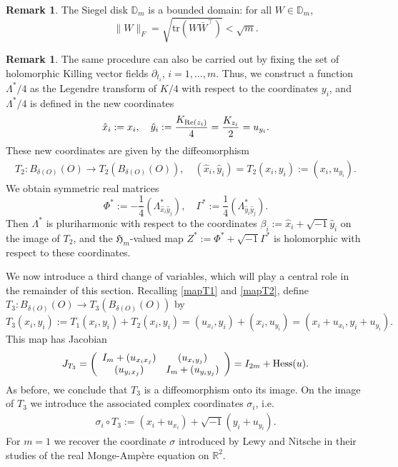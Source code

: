 \documentclass[11pt,reqno]{amsart}
\theoremstyle{plain}
\theoremstyle{definition}
\newtheorem{remark}[theorem]{Remark}
\numberwithin{equation}{section}
\begin{document}
\begin{remark}\label{bounded}  
The Siegel disk $\mathbb{D}_m$ is a bounded domain: for all $W\in \mathbb{D}_{m}$,
$$\|W\|_F = \sqrt{\mathrm{tr}(W\overline{W}^{\top})} < \sqrt{m}.$$
\end{remark}
    
\begin{remark}
The same procedure can also be carried out by fixing the set of holomorphic Killing vector fields $\partial_{t_i}$, $i = 1,\ldots, m$. Thus, we construct a function $\Lambda^{*}/4$ as the Legendre transform of $K/4$ with respect to the coordinates $y_{i}$, and $\Lambda^*/4$ is defined in the new coordinates
$$\hat{x}_{i}:=x_{i},\quad  \hat{y}_{i}:=\frac{K_{{\rm Re}(z_i)}}{4} = \frac{K_{z_{i}}}{2}=u_{y_{i}}.$$
These new coordinates are given by the diffeomorphism
\begin{align}\label{mapT2}T_{2}: B_{\delta(O)}(O)\to T_{2}(B_{\delta(O)}(O)), \quad (\hat{x}_i, \hat{y}_i) = T_2(x_i,y_i) := (x_{i},u_{y_{i}}).\end{align}
We obtain symmetric real matrices
$$\Phi^* := -\frac{1}{4}(\Lambda^{*}_{\hat{x}_{i}\hat{y}_{j}}),\quad  \Gamma^* :=\frac{1}{4}(\Lambda^{*}_{\hat{y}_{i}\hat{y}_{j}}).$$
Then $\Lambda^{*}$ is pluriharmonic with respect to the coordinates $\beta_{i}:=\hat{x}_{i}+\sqrt{-1}\hat{y}_{i}$ on the image of $T_2$, and the $\mathfrak{H}_m$-valued map $Z^*:=\Phi^*+\sqrt{-1}\Gamma^*$ is holomorphic with respect to these coordinates.
\end{remark}

We now introduce a third change of variables, which will play a central role in the remainder of this section. Recalling \eqref{mapT1} and \eqref{mapT2}, define $T_{3}: B_{\delta(O)}(O)\to T_{3}(B_{\delta(O)}(O))$ by
\begin{equation}\label{T3m}
     T_{3}(x_{i},y_{i}) := T_{1}(x_{i},y_{i})+T_{2}(x_{i},y_{i})= (u_{x_{i}},y_{i})+(x_{i},u_{y_{i}})= (x_{i}+u_{x_{i}},y_{i}+u_{y_{i}}).
\end{equation}
This map has Jacobian
\begin{align}\label{JacT3}J_{T_{3}}=\left(\begin{array}{cc}
   I_{m}+(u_{x_{i}x_{j}})  & (u_{x_{i}y_{j}})  \\
    (u_{y_{i}x_{j}}) & I_{m}+(u_{y_{i}y_{j}})
\end{array}\right) = I_{2m} + {\rm Hess}(u).\end{align}
As before, we conclude that $T_3$ is a diffeomorphism onto its image. On the image of $T_3$ we introduce the associated complex coordinates $\sigma_i$, i.e.
\begin{align}\label{def_sigma}
\sigma_{i} \circ T_3:=(x_{i}+u_{x_{i}})+\sqrt{-1}(y_{i}+u_{y_{i}}).
 \end{align}
    For $m=1$ we recover the coordinate $\sigma$ introduced by Lewy \cite{Lewy1,Lewy2} and Nitsche \cite{Nit} in their studies of the real Monge-Ampère equation on $\mathbb{R}^2$.
\end{document}
